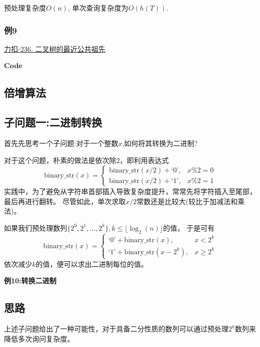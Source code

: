 \documentclass{article}
\newcommand{\inputcppfile}[1]{}
\begin{document}
预处理复杂度$O(n)$, 单次查询复杂度为$O(h(T))$.
\subsubsection{例9}
\href{https://leetcode.cn/problems/lowest-common-ancestor-of-a-binary-tree/}{力扣-236. 二叉树的最近公共祖先}
\par\textbf{Code}\par
\inputcppfile{Code_9.cpp}

\subsection{倍增算法}
\subsection{子问题一:二进制转换}
首先先思考一个子问题:对于一个整数$x$,如何将其转换为二进制?

对于这个问题，朴素的做法是依次除2，即利用表达式
\begin{equation}
    \text{binary\_str}(x) = \begin{cases}
        \text{binary\_str}(x/2) + \text{`0'}, & x\%2 = 0 \\
        \text{binary\_str}(x/2) + \text{`1'}, & x\%2 = 1
    \end{cases}
\end{equation}
实践中，为了避免从字符串首部插入导致复杂度提升，常常先将字符插入至尾部，最后再进行翻转。
尽管如此，单次求取$x/2$常数还是比较大(较比于加减法和乘法)。

如果我们预处理数列$\{2^0,2^1,...,2^k\},  k \leq  \lfloor \log_2(n)\rfloor$的值，
于是可有
\begin{equation}
    \text{binary\_str}(x) = \begin{cases}
        \text{`0'} + \text{binary\_str}(x),       & x< 2^k    \\
        \text{`1'} + \text{binary\_str}(x - 2^k), & x\geq 2^k
    \end{cases}
\end{equation}
依次减少$k$的值，便可以求出二进制每位的值。

\textbf{例10:转换二进制}
\inputcppfile{Code_10.cpp}

\subsection{思路}
上述子问题给出了一种可能性，对于具备二分性质的数列可以通过预处理$2^k$数列来降低多次询问复杂度。
\end{document}
